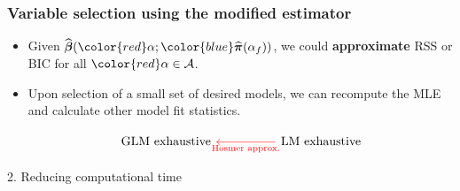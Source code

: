\documentclass[12pt,aspectratio=169]{beamer}
\newcommand{\bbetaHat}{\widehat{\boldsymbol{\beta}}}
\newcommand{\bPiHat}{\widehat{\boldsymbol{\pi}}}
\newcommand{\alphaFull}{\alpha_{f}}
\begin{document}
\begin{frame}[fragile] %
	\frametitle{Variable selection using the modified estimator}
	\begin{itemize}
		\item Given $ \bbetaHat({\color{red}\alpha}; {\color{blue}\bPiHat(\alphaFull)}) $, we could \textbf{approximate} RSS or BIC for all $ {\color{red}\alpha} \in \mathcal{A} $. 
		
		\item Upon selection of a small set of desired models, we can recompute the MLE and calculate other model fit statistics. 
		

\vspace{0.5cm}
\begin{equation*}
\begin{tikzcd}[column sep=huge]
\text{GLM exhaustive}
& \arrow[l, red, "\text{Hosmer approx.}", red] \text{LM exhaustive}
\end{tikzcd}
\end{equation*}

\end{itemize}

\end{frame}



\begin{frame}
\Huge{\color{themeBlue} 2. Reducing computational time}
\end{frame}
\end{document}
